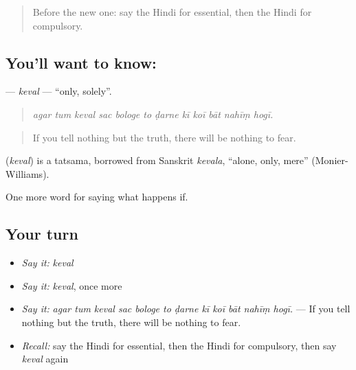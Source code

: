 \label{lesson:HI-C378-keval}



\begin{quote}
Before the new one: say the Hindi for essential, then the Hindi for compulsory.
\end{quote}

\subsection*{You'll want to know: }
\textbf{} — \emph{keval} — \textquotedblleft{}only, solely\textquotedblright{}.

\begin{quote}
           
\end{quote}

\begin{quote}
\emph{agar tum keval sac bologe to ḍarne kī koī bāt nahīṃ hogī.}
\end{quote}

\begin{quote}
If you tell nothing but the truth, there will be nothing to fear.
\end{quote}

\begin{cousinweb}
\textbf{} (\emph{keval}) is a tatsama, borrowed from Sanskrit \emph{kevala}, \textquotedblleft{}alone, only, mere\textquotedblright{} (Monier-Williams).
\end{cousinweb}

\begin{grammarlens}[title={What you've built}]
One more word for saying what happens if.
\end{grammarlens}

\subsection*{Your turn}
\begin{itemize}
\raggedright
  \item \emph{Say it:} \emph{keval}
  \item \emph{Say it:} \emph{keval}, once more
  \item \emph{Say it:} \emph{agar tum keval sac bologe to ḍarne kī koī bāt nahīṃ hogī.} — If you tell nothing but the truth, there will be nothing to fear.
  \item \emph{Recall:} say the Hindi for essential, then the Hindi for compulsory, then say \emph{keval} again
\end{itemize}

